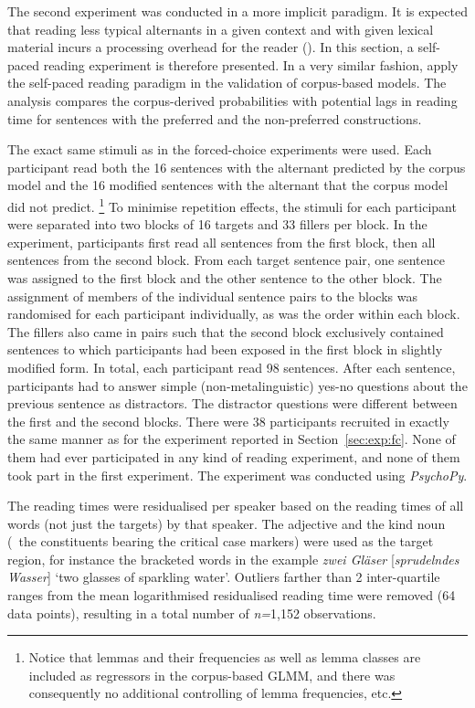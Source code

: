 The second experiment was conducted in a more implicit paradigm.
It is expected that reading less typical alternants in a given context and with given lexical material incurs a processing overhead for the reader (\citealp{Kaiser2013}).
In this section, a self-paced reading experiment is therefore presented.
In a very similar fashion, \cite{DivjakEa2016} apply the self-paced reading paradigm in the validation of corpus-based models.
The analysis compares the corpus-derived probabilities with potential lags in reading time for sentences with the preferred and the non-preferred constructions.

The exact same stimuli as in the forced-choice experiments were used.
Each participant read both the 16 sentences with the alternant predicted by the corpus model and the 16 modified sentences with the alternant that the corpus model did not predict.%
\footnote{Notice that lemmas and their frequencies as well as lemma classes are included as regressors in the corpus-based GLMM, and there was consequently no additional controlling of lemma frequencies, etc.}
To minimise repetition effects, the stimuli for each participant were separated into two blocks of 16 targets and 33 fillers per block.
In the experiment, participants first read all sentences from the first block, then all sentences from the second block.
From each target sentence pair, one sentence was assigned to the first block and the other sentence to the other block.
The assignment of members of the individual sentence pairs to the blocks was randomised for each participant individually, as was the order within each block.
The fillers also came in pairs such that the second block exclusively contained sentences to which participants had been exposed in the first block in slightly modified form.
In total, each participant read 98 sentences.
After each sentence, participants had to answer simple (non-metalinguistic) yes-no questions about the previous sentence as distractors.
The distractor questions were different between the first and the second blocks.
There were 38 participants recruited in exactly the same manner as for the experiment reported in Section~\ref{sec:exp:fc}.
None of them had ever participated in any kind of reading experiment, and none of them took part in the first experiment.
The experiment was conducted using \textit{PsychoPy}.

The reading times were residualised per speaker based on the reading times of all words (not just the targets) by that speaker.
The adjective and the kind noun (\ie\ the constituents bearing the critical case markers) were used as the target region, for instance the bracketed words in the example \textit{zwei Gläser} [\textit{spru\-deln\-des Wasser}] `two glasses of sparkling water'.
Outliers farther than 2 inter-quartile ranges from the mean logarithmised residualised reading time were removed (64 data points), resulting in a total number of \textit{n=}1,152 observations.

